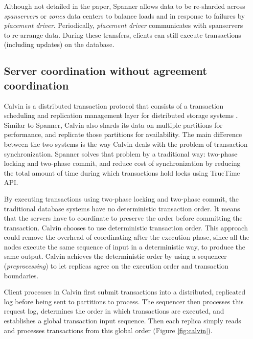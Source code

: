 Although not detailed in the paper, Spanner allows data to be re-sharded across
\emph{spanservers} or \emph{zones} data centers to balance loads and in response
to failures by \emph{placement driver}. Periodically, \emph{placement driver}
communicates with spanservers to re-arrange data. During these transfers,
clients can still execute transactions (including updates) on the database.

\subsection{Server coordination without agreement coordination}

Calvin is a distributed transaction protocol that consists of a transaction
scheduling and replication management layer for distributed storage systems
\cite{calvin}. Similar to Spanner, Calvin also shards its data on multiple
partitions for performance, and replicate those partitions for availability. The
main difference between the two systems is the way Calvin deals with the problem
of transaction synchronization. Spanner solves that problem by a traditional
way: two-phase locking and two-phase commit, and reduce cost of synchronization
by reducing the total amount of time during which transactions hold locks using
TrueTime API.

By executing transactions using two-phase locking and two-phase commit, the
traditional database systems have no deterministic transaction order. It means
that the servers have to coordinate to preserve the order before committing the
transaction. Calvin chooses to use deterministic transaction order. This
approach could remove the overhead of coordinating after the execution phase,
since all the nodes execute the same sequence of input in a deterministic way,
to produce the same output. Calvin achieves the deterministic order by using
a sequencer (\emph{preprocessing}) to let replicas agree on the execution order and
transaction boundaries.

Client processes in Calvin first submit transactions into a distributed,
replicated log before being sent to partitions to process. The sequencer then
processes this request log, determines the order in which transactions are
executed, and establishes a global transaction input sequence. Then each replica
simply reads and processes transactions from this global order (Figure
\ref{fig:calvin}).

